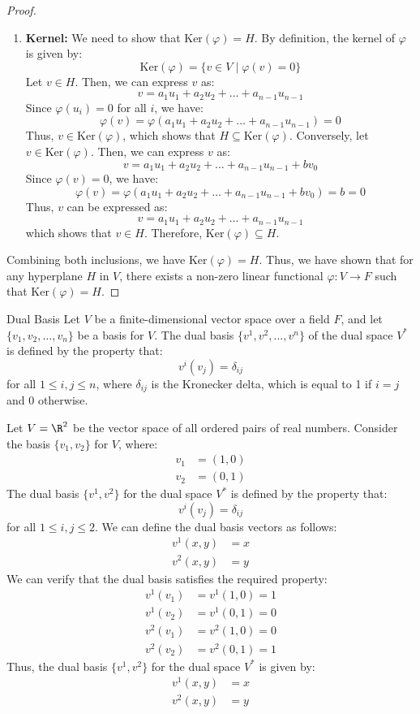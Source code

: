 \documentclass[openany]{book}
\begin{document}
\begin{proof}
\begin{enumerate}
    \item \textbf{Kernel:} We need to show that $\text{Ker}(\varphi) = H$. By definition, the kernel of $\varphi$ is given by:
    $$\text{Ker}(\varphi) = \{v \in V \mid \varphi(v) = 0\}$$
    Let $v \in H$. Then, we can express $v$ as:
    $$v = a_1 u_1 + a_2 u_2 + \ldots + a_{n-1} u_{n-1}$$
    Since $\varphi(u_i) = 0$ for all $i$, we have:
    $$\varphi(v) = \varphi(a_1 u_1 + a_2 u_2 + \ldots + a_{n-1} u_{n-1}) = 0$$
    Thus, $v \in \text{Ker}(\varphi)$, which shows that $H \subseteq \text{Ker}(\varphi)$.
    Conversely, let $v \in \text{Ker}(\varphi)$. Then, we can express $v$ as:
    $$v = a_1 u_1 + a_2 u_2 + \ldots + a_{n-1} u_{n-1} + b v_0$$
    Since $\varphi(v) = 0$, we have:
    $$\varphi(v) = \varphi(a_1 u_1 + a_2 u_2 + \ldots + a_{n-1} u_{n-1} + b v_0) = b = 0$$
    Thus, $v$ can be expressed as:
    $$v = a_1 u_1 + a_2 u_2 + \ldots + a_{n-1} u_{n-1}$$
    which shows that $v \in H$. Therefore, $\text{Ker}(\varphi) \subseteq H$.
\end{enumerate}
Combining both inclusions, we have $\text{Ker}(\varphi) = H$. Thus, we have shown that for any hyperplane $H$ in $V$, there exists a non-zero linear functional $\varphi: V \to F$ such that $\text{Ker}(\varphi) = H$.
\end{proof}
\begin{mydefinition}{Dual Basis}
Let $V$ be a finite-dimensional vector space over a field $F$, and let $\{v_1, v_2, \ldots, v_n\}$ be a basis for $V$. The dual basis $\{v^1, v^2, \ldots, v^n\}$ of the dual space $V^*$ is defined by the property that:
$$v^i(v_j) = \delta_{ij}$$
for all $1 \leq i, j \leq n$, where $\delta_{ij}$ is the Kronecker delta, which is equal to 1 if $i = j$ and 0 otherwise.
\end{mydefinition} 
\begin{example}
Let $V = \R^2$ be the vector space of all ordered pairs of real numbers. Consider the basis $\{v_1, v_2\}$ for $V$, where:
\[\begin{aligned}
v_1 &= (1, 0) \\
v_2 &= (0, 1)
\end{aligned}\]
The dual basis $\{v^1, v^2\}$ for the dual space $V^*$ is defined by the property that:
$$v^i(v_j) = \delta_{ij}$$
for all $1 \leq i, j \leq 2$. We can define the dual basis vectors as follows:
\[\begin{aligned}
v^1(x, y) &= x \\
v^2(x, y) &= y
\end{aligned}\]
We can verify that the dual basis satisfies the required property:
\[\begin{aligned}
v^1(v_1) &= v^1(1, 0) = 1 \\
v^1(v_2) &= v^1(0, 1) = 0 \\
v^2(v_1) &= v^2(1, 0) = 0 \\
v^2(v_2) &= v^2(0, 1) = 1
\end{aligned}\]
Thus, the dual basis $\{v^1, v^2\}$ for the dual space $V^*$ is given by:
\[\begin{aligned}
v^1(x, y) &= x \\
v^2(x, y) &= y
\end{aligned}\]
\end{example}
\end{document}

